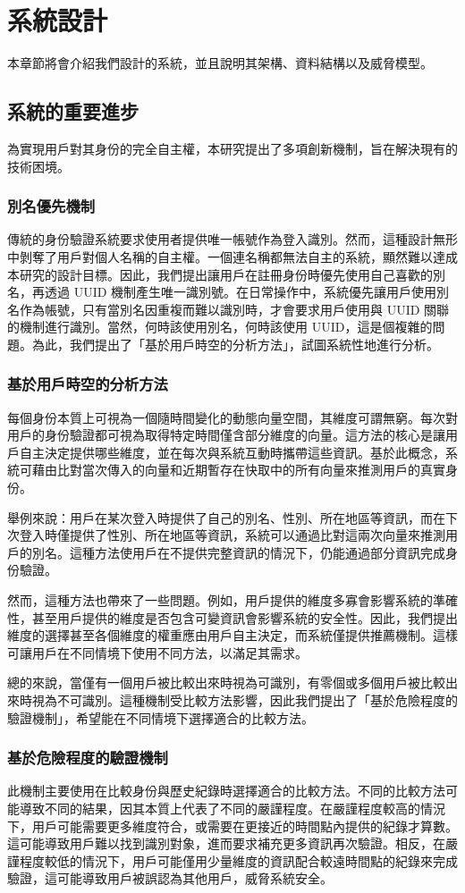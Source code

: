 
\chapter{系統設計}
本章節將會介紹我們設計的系統，並且說明其架構、資料結構以及威脅模型。
\section{系統的重要進步}
為實現用戶對其身份的完全自主權，本研究提出了多項創新機制，旨在解決現有的技術困境。
\subsection{別名優先機制}
傳統的身份驗證系統要求使用者提供唯一帳號作為登入識別。然而，這種設計無形中剝奪了用戶對個人名稱的自主權。一個連名稱都無法自主的系統，顯然難以達成本研究的設計目標。因此，我們提出讓用戶在註冊身份時優先使用自己喜歡的別名，再透過 UUID 機制\cite{uuid}產生唯一識別號。在日常操作中，系統優先讓用戶使用別名作為帳號，只有當別名因重複而難以識別時，才會要求用戶使用與 UUID 關聯的機制進行識別。當然，何時該使用別名，何時該使用 UUID，這是個複雜的問題。為此，我們提出了「基於用戶時空的分析方法」，試圖系統性地進行分析。
\subsection{基於用戶時空的分析方法}
每個身份本質上可視為一個隨時間變化的動態向量空間，其維度可謂無窮。每次對用戶的身份驗證都可視為取得特定時間僅含部分維度的向量。這方法的核心是讓用戶自主決定提供哪些維度，並在每次與系統互動時攜帶這些資訊。基於此概念，系統可藉由比對當次傳入的向量和近期暫存在快取中的所有向量來推測用戶的真實身份。

舉例來說：用戶在某次登入時提供了自己的別名、性別、所在地區等資訊，而在下次登入時僅提供了性別、所在地區等資訊，系統可以通過比對這兩次向量來推測用戶的別名。這種方法使用戶在不提供完整資訊的情況下，仍能通過部分資訊完成身份驗證。

然而，這種方法也帶來了一些問題。例如，用戶提供的維度多寡會影響系統的準確性，甚至用戶提供的維度是否包含可變資訊會影響系統的安全性。因此，我們提出維度的選擇甚至各個維度的權重應由用戶自主決定，而系統僅提供推薦機制。這樣可讓用戶在不同情境下使用不同方法，以滿足其需求。

總的來說，當僅有一個用戶被比較出來時視為可識別，有零個或多個用戶被比較出來時視為不可識別。這種機制受比較方法影響，因此我們提出了「基於危險程度的驗證機制」，希望能在不同情境下選擇適合的比較方法。
\subsection{基於危險程度的驗證機制}
此機制主要使用在比較身份與歷史紀錄時選擇適合的比較方法。不同的比較方法可能導致不同的結果，因其本質上代表了不同的嚴謹程度。在嚴謹程度較高的情況下，用戶可能需要更多維度符合，或需要在更接近的時間點內提供的紀錄才算數。這可能導致用戶難以找到識別對象，進而要求補充更多資訊再次驗證。相反，在嚴謹程度較低的情況下，用戶可能僅用少量維度的資訊配合較遠時間點的紀錄來完成驗證，這可能導致用戶被誤認為其他用戶，威脅系統安全。

